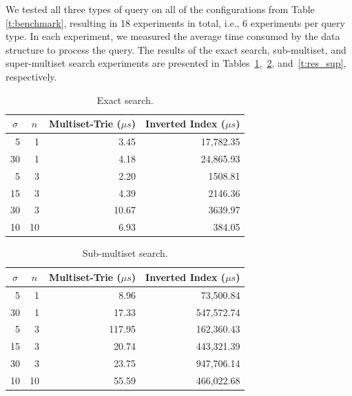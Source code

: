 \documentclass[algorithms,article,accept,pdftex,moreauthors]{Definitions/mdpi}
\begin{document}
We tested all three types of query on all of the configurations from
Table \ref{t:benchmark}, resulting in 18 experiments in total, i.e., 6 experiments per
query type. In each experiment, we measured the average time consumed
by the data structure to process the query. The results of the exact
search, sub-multiset, and super-multiset search experiments are
presented in Tables~\ref{t:res_ex},~\ref{t:res_sub}, and~\ref{t:res_sup}, respectively.

\begin{table}[H]
\caption{Exact search.}
\label{t:res_ex}
\begin{tabularx}{\textwidth}{rrrr}
\toprule
\multicolumn{1}{c}{\boldmath$\sigma$} & 
\multicolumn{1}{c}{\boldmath$n$} & 
\multicolumn{1}{c}{\textbf{Multiset-Trie (\boldmath$\mu s$)}} & 
\multicolumn{1}{c}{\textbf{Inverted Index (\boldmath$\mu s$)}} \\
\midrule
5		& 1 & 3.45 & 17,782.35\\
30	& 1 & 4.18 & 24,865.93\\
5		& 3 & 2.20 & 1508.81\\
15	& 3 & 4.39 & 2146.36\\
30	& 3 & 10.67 & 3639.97\\
10	& 10 & 6.93 & 384.05\\
\bottomrule
\end{tabularx}
\end{table}

\begin{table}[H]
\caption{Sub-multiset search.}
\label{t:res_sub}
\begin{tabularx}{\textwidth}{rrrr}
\toprule
\multicolumn{1}{c}{\boldmath$\sigma$} & 
\multicolumn{1}{c}{\boldmath$n$} & 
\multicolumn{1}{c}{\textbf{Multiset-Trie (\boldmath$\mu s$)}} & 
\multicolumn{1}{c}{\textbf{Inverted Index (\boldmath$\mu s$)}} \\
\midrule
5		& 1			& 8.96 & 73,500.84\\
30	& 1			& 17.33 & 547,572.74\\
5		& 3			& 117.95 & 162,360.43\\
15	& 3			& 20.74 & 443,321.39\\
30	& 3 		& 23.75 & 947,706.14\\
10	& 10		& 55.59 & 466,022.68\\
\bottomrule
\end{tabularx}
\end{table}
\end{document}
